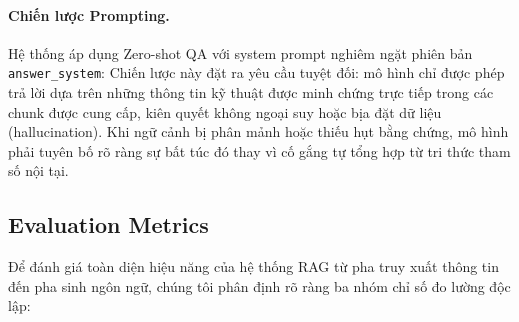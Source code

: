 \paragraph{Chiến lược Prompting.}
Hệ thống áp dụng Zero-shot QA với system prompt nghiêm ngặt phiên bản \texttt{answer\_system}:
Chiến lược này đặt ra yêu cầu tuyệt đối: mô hình chỉ được phép trả lời dựa trên những thông tin kỹ thuật được minh chứng trực tiếp trong các chunk được cung cấp, kiên quyết không ngoại suy hoặc bịa đặt dữ liệu (hallucination). Khi ngữ cảnh bị phân mảnh hoặc thiếu hụt bằng chứng, mô hình phải tuyên bố rõ ràng sự bất túc đó thay vì cố gắng tự tổng hợp từ tri thức tham số nội tại.

\subsection{Evaluation Metrics}
\label{subsec:evaluation_metrics}

Để đánh giá toàn diện hiệu năng của hệ thống RAG từ pha truy xuất thông tin đến pha sinh ngôn ngữ, chúng tôi phân định rõ ràng ba nhóm chỉ số đo lường độc lập:

